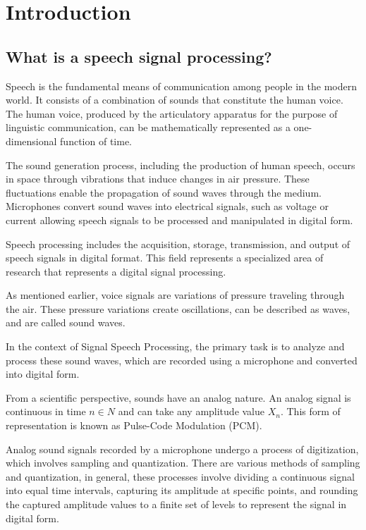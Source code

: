 \section{Introduction}\label{sec:introduction}

\subsection{What is a speech signal processing?}\label{subsec:what-is-a-speech-signal?}
Speech is the fundamental means of communication among people in the modern world.
It consists of a combination of sounds that constitute the human voice.
The human voice, produced by the articulatory apparatus for the purpose of
linguistic communication, can be mathematically represented as a one-dimensional function of time. \cite{schroeder}

The sound generation process, including the production of human speech, occurs in space through vibrations that induce
changes in air pressure.
These fluctuations enable the propagation of sound waves through the medium.
Microphones convert sound waves into electrical signals, such as voltage or current allowing speech signals to
be processed and manipulated in digital form.


Speech processing includes the acquisition, storage, transmission, and output of speech signals in digital format.
This field represents a specialized area of research that represents a digital signal processing. \cite{priyanka}


As mentioned earlier, voice signals are variations of pressure traveling through the air.
These pressure variations create oscillations, can be described as waves, and are called sound waves.

In the context of Signal Speech Processing, the primary task is to analyze and process these sound waves,
which are recorded using a microphone and converted into digital form.

From a scientific perspective, sounds have an analog nature.
An analog signal is continuous in time \(n \in N \) and can take any amplitude value \(X_n\).
This form of representation is known as Pulse-Code Modulation (PCM). \cite{faruque}

Analog sound signals recorded by a microphone undergo a process of digitization, which involves sampling and quantization.
There are various methods of sampling and quantization, in general, these processes involve dividing a continuous
signal into equal time intervals, capturing its amplitude at specific points, and rounding the captured amplitude
values to a finite set of levels to represent the signal in digital form. \cite{owens}


